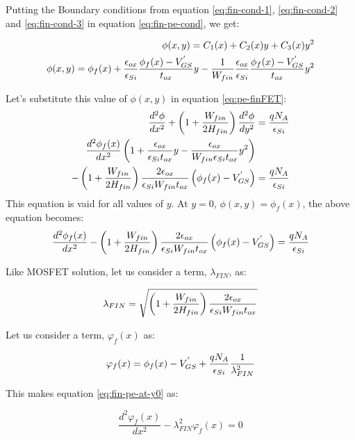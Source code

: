 \documentclass[a4paper]{article}
\begin{document}
Putting the Boundary conditions from equation \ref{eq:fin-cond-1}, \ref{eq:fin-cond-2} and \ref{eq:fin-cond-3} in equation \ref{eq:fin-pe-cond}, we get:

\begin{align*}
  \phi(x,y) = C_1(x) + C_2(x)y  + C_3(x)y^2\\
  \phi(x,y) = \phi_f(x) + \frac {\epsilon_{ox}} {\epsilon_{Si}} \frac{\phi_f(x) - V_{GS}^{'}}{t_{ox}} y -  \frac{1}{W_{fin}} \frac {\epsilon_{ox}} {\epsilon_{Si}} \frac{\phi_f(x) - V_{GS}^{'}}{t_{ox}} y^2
\end{align*}

Let's substitute this value of $\phi(x,y)$ in equation \ref{eq:pe-finFET}:
\begin{equation*}
  \begin{split}
    \frac {d^2\phi} {dx^2} + \left( 1 + \frac{W_{fin}} {2 H_{fin}} \right) \frac {d^2\phi} {dy^2} & = \frac{qN_A} {\epsilon_{Si}}\\
\frac{d^2\phi_f(x)}{dx^2} \left(1 + \frac{\epsilon_{ox}}{\epsilon_{Si}t_{ox}}y - \frac{\epsilon_{ox}}{W_{fin} \epsilon_{Si}t_{ox}}y^2\right)&\quad\\
- \left( 1 + \frac{W_{fin}}{2 H_{fin}} \right) \frac{2 \epsilon_{ox}}{\epsilon_{Si}W_{fin} t_{ox}}\left( \phi_f(x) - V_{GS}^{'}\right) &= \frac{qN_A} {\epsilon_{Si}}\\
  \end{split}
\end{equation*}
This equation is vaid for all values of $y$. At $y=0$, $\phi(x,y)=\phi_f(x)$, the above equation becomes:
\begin{equation}
  \label{eq:fin-pe-at-y0}
  \frac{d^2\phi_f(x)}{dx^2} - \left( 1 + \frac{W_{fin}}{2 H_{fin}} \right) \frac{2 \epsilon_{ox}}{\epsilon_{Si}W_{fin} t_{ox}}\left( \phi_f(x) - V_{GS}^{'}\right) = \frac{qN_A} {\epsilon_{Si}}
\end{equation}

Like MOSFET solution, let us consider a term, $\lambda_{FIN}$, as:

\begin{equation}
  \lambda_{FIN} = \sqrt {\left( 1 + \frac{W_{fin}}{2 H_{fin}} \right) \frac{2 \epsilon_{ox}}{\epsilon_{Si}W_{fin} t_{ox}}}
\end{equation}

Let us consider a term, $\varphi_f(x)$ as:

\begin{equation}
  \varphi_f(x) = \phi_f(x) - V_{GS}^{'} + \frac{qN_A} {\epsilon_{Si}} \frac{1}{\lambda_{FIN}^2}
\end{equation}

This makes equation \ref{eq:fin-pe-at-y0} as:

\begin{equation}
  \label{eq:varphi-fin}
  \frac{d^2\varphi_f(x)}{dx^2} - \lambda_{FIN}^2\varphi_f(x) = 0
\end{equation}
\end{document}
